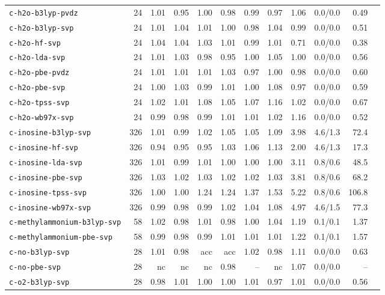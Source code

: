 \begin{longtable}{lrrrrrrrrrrr}
\texttt{c-h2o-b3lyp-pvdz} & 24 & 1.01 & 0.95 & 1.00 & 0.98 & 0.99 & 0.97 & 1.06 & 0.0/0.0 & 0.49 \\
\texttt{c-h2o-b3lyp-svp} & 24 & 1.01 & 1.04 & 1.01 & 1.00 & 0.98 & 1.04 & 0.99 & 0.0/0.0 & 0.51 \\
\texttt{c-h2o-hf-svp} & 24 & 1.04 & 1.04 & 1.03 & 1.01 & 0.99 & 1.01 & 0.71 & 0.0/0.0 & 0.38 \\
\texttt{c-h2o-lda-svp} & 24 & 1.01 & 1.03 & 0.98 & 0.95 & 1.00 & 1.05 & 1.00 & 0.0/0.0 & 0.56 \\
\texttt{c-h2o-pbe-pvdz} & 24 & 1.01 & 1.01 & 1.01 & 1.03 & 0.97 & 1.00 & 0.98 & 0.0/0.0 & 0.60 \\
\texttt{c-h2o-pbe-svp} & 24 & 1.00 & 1.03 & 0.99 & 1.01 & 1.00 & 1.08 & 0.97 & 0.0/0.0 & 0.59 \\
\texttt{c-h2o-tpss-svp} & 24 & 1.02 & 1.01 & 1.08 & 1.05 & 1.07 & 1.16 & 1.02 & 0.0/0.0 & 0.67 \\
\texttt{c-h2o-wb97x-svp} & 24 & 0.99 & 0.98 & 0.99 & 1.01 & 1.01 & 1.02 & 1.16 & 0.0/0.0 & 0.52 \\
\texttt{c-inosine-b3lyp-svp} & 326 & 1.01 & 0.99 & 1.02 & 1.05 & 1.05 & 1.09 & 3.98 & 4.6/1.3 & 72.4 \\
\texttt{c-inosine-hf-svp} & 326 & 0.94 & 0.95 & 0.95 & 1.03 & 1.06 & 1.13 & 2.00 & 4.6/1.3 & 17.3 \\
\texttt{c-inosine-lda-svp} & 326 & 1.01 & 0.99 & 1.01 & 1.00 & 1.00 & 1.00 & 3.11 & 0.8/0.6 & 48.5 \\
\texttt{c-inosine-pbe-svp} & 326 & 1.03 & 1.02 & 1.03 & 1.02 & 1.02 & 1.03 & 3.81 & 0.8/0.6 & 68.2 \\
\texttt{c-inosine-tpss-svp} & 326 & 1.00 & 1.00 & 1.24 & 1.24 & 1.37 & 1.53 & 5.22 & 0.8/0.6 & 106.8 \\
\texttt{c-inosine-wb97x-svp} & 326 & 0.99 & 0.98 & 0.99 & 1.02 & 1.04 & 1.08 & 4.97 & 4.6/1.5 & 77.3 \\
\texttt{c-methylammonium-b3lyp-svp} & 58 & 1.02 & 0.98 & 1.01 & 0.98 & 1.00 & 1.04 & 1.19 & 0.1/0.1 & 1.37 \\
\texttt{c-methylammonium-pbe-svp} & 58 & 0.99 & 0.98 & 0.99 & 1.01 & 1.01 & 1.01 & 1.22 & 0.1/0.1 & 1.57 \\
\texttt{c-no-b3lyp-svp} & 28 & 1.01 & 0.98 & acc & acc & 1.02 & 0.98 & 1.11 & 0.0/0.0 & 0.63 \\
\texttt{c-no-pbe-svp} & 28 & nc & nc & nc & 0.98 & -- & nc & 1.07 & 0.0/0.0 & -- \\
\texttt{c-o2-b3lyp-svp} & 28 & 0.98 & 1.01 & 1.00 & 1.00 & 1.01 & 0.97 & 1.01 & 0.0/0.0 & 0.56 \\

\end{longtable}

